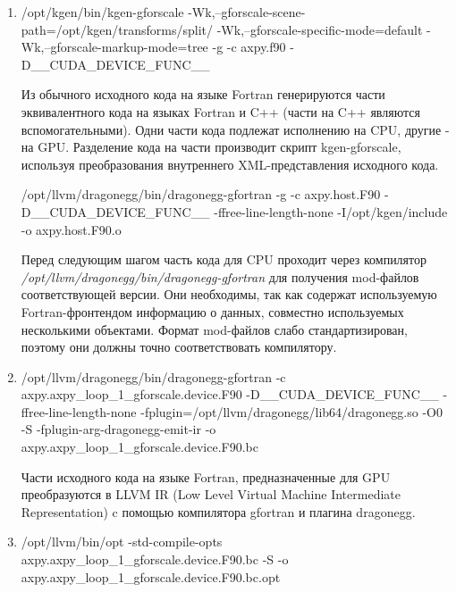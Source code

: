 \documentclass[a4,12pt]{report}
\begin{document}
\begin{enumerate}

\item

\begin{code}
/opt/kgen/bin/kgen-gforscale
-Wk,--gforscale-scene-path=/opt/kgen/transforms/split/
-Wk,--gforscale-specific-mode=default
-Wk,--gforscale-markup-mode=tree -g -c axpy.f90 -D__CUDA_DEVICE_FUNC__
\end{code}

Из обычного исходного кода на языке Fortran генерируются части эквивалентного кода на языках Fortran и C++ (части на C++ являются вспомогательными). Одни части кода подлежат исполнению на CPU, другие - на GPU. Разделение кода на части производит скрипт kgen-gforscale, используя преобразования внутреннего XML-представления исходного кода.

\begin{code}
/opt/llvm/dragonegg/bin/dragonegg-gfortran -g -c axpy.host.F90
-D__CUDA_DEVICE_FUNC__ -ffree-line-length-none -I/opt/kgen/include -o
axpy.host.F90.o
\end{code}

Перед следующим шагом часть кода для CPU проходит через компилятор \emph{/opt/llvm/dragonegg/bin/dragonegg-gfortran} для получения mod-файлов соответствующей версии. Они необходимы, так как содержат используемую Fortran-фронтендом информацию о данных, совместно используемых несколькими объектами. Формат mod-файлов слабо стандартизирован, поэтому они должны точно соответствовать компилятору.
\item

\begin{code}
/opt/llvm/dragonegg/bin/dragonegg-gfortran -c
axpy.axpy_loop_1_gforscale.device.F90 -D__CUDA_DEVICE_FUNC__
-ffree-line-length-none
-fplugin=/opt/llvm/dragonegg/lib64/dragonegg.so -O0 -S
-fplugin-arg-dragonegg-emit-ir -o axpy.axpy_loop_1_gforscale.device.F90.bc
\end{code}

Части исходного кода на языке Fortran, предназначенные для GPU преобразуются в LLVM IR (Low Level Virtual Machine Intermediate Representation) c помощью компилятора gfortran и плагина dragonegg.

\item

\begin{code}
/opt/llvm/bin/opt -std-compile-opts
axpy.axpy_loop_1_gforscale.device.F90.bc -S -o
axpy.axpy_loop_1_gforscale.device.F90.bc.opt
\end{code}


\end{enumerate}
\end{document}
